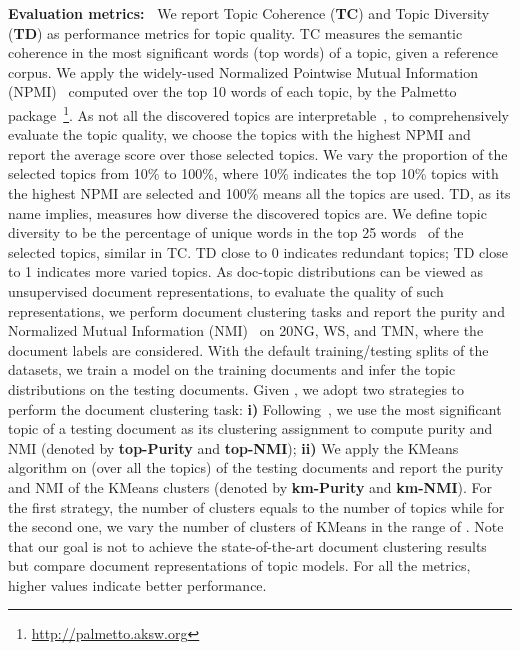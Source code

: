 \documentclass{article}
\begin{document}
\textbf{Evaluation metrics:~}
We report Topic Coherence (\textbf{TC}) and Topic Diversity (\textbf{TD}) as performance metrics for topic quality.
TC measures the semantic coherence in the most significant words (top words) of a topic, given a reference corpus.
We apply the widely-used Normalized Pointwise Mutual Information (NPMI)~\citep{aletras2013evaluating,lau2014machine} computed over the top 10 words of each topic, by the Palmetto package~\citep{roder2015exploring}\footnote{\url{http://palmetto.aksw.org}}.
As not all the discovered topics are interpretable~\citep{yang2015efficient,zhao2018dirichlet}, to comprehensively evaluate the topic quality,
we choose the topics with the highest NPMI and report the average score over those selected topics.
We vary the proportion of the selected topics from 10\% to 100\%, where 10\% indicates the top 10\% topics with the highest NPMI are selected and 100\% means all the topics are used.
TD, as its name implies, measures how diverse the discovered topics are. We define topic diversity to be the percentage of unique words in the top 25 words~\citep{dieng2019topic} of the selected topics, similar in TC. TD close to 0 indicates redundant topics; TD close to 1 indicates more varied topics.
As doc-topic distributions can be viewed as unsupervised document representations, to evaluate the quality of such representations, we perform document clustering tasks and report the purity and Normalized Mutual Information (NMI)~\citep{manning2008introduction} on 20NG, WS, and TMN, where the document labels are considered. With the default training/testing splits of the datasets, we train a model on the training documents and infer the topic distributions  on the testing documents. Given , we adopt two strategies to perform the document clustering task: \textbf{i)} Following~\citet{nguyen2015improving}, we use the most significant topic of a testing document as its clustering assignment to compute purity and NMI (denoted by \textbf{top-Purity} and \textbf{top-NMI}); \textbf{ii)} We apply the KMeans algorithm on  (over all the topics) of the testing documents and report the purity and NMI of the KMeans clusters (denoted by \textbf{km-Purity} and \textbf{km-NMI}). For the first strategy, the number of clusters equals to the number of topics while for the second one, we vary the number of clusters of KMeans in the range of . Note that our goal is not to achieve the state-of-the-art document clustering results but compare document representations of topic models. For all the metrics, higher values indicate better performance. 
\end{document}

